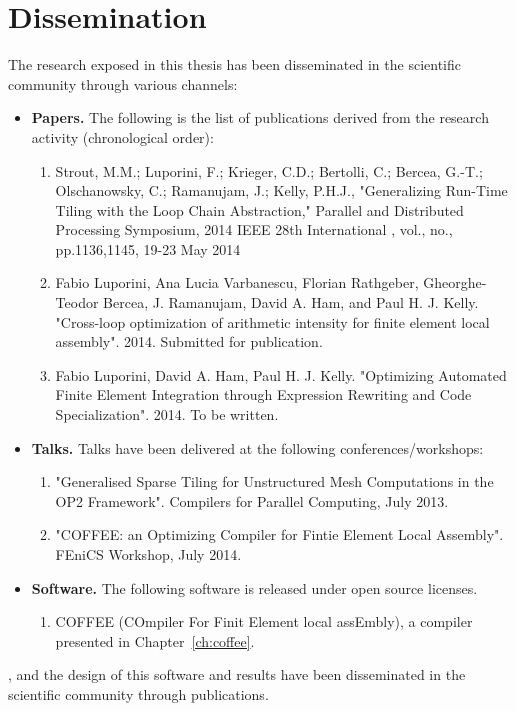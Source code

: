 \section{Dissemination}
The research exposed in this thesis has been disseminated in the scientific community through various channels:
\begin{itemize}
\item \textbf{Papers.} The following is the list of publications derived from the research activity (chronological order):
\begin{enumerate}
\item Strout, M.M.; Luporini, F.; Krieger, C.D.; Bertolli, C.; Bercea, G.-T.; Olschanowsky, C.; Ramanujam, J.; Kelly, P.H.J., "Generalizing Run-Time Tiling with the Loop Chain Abstraction," Parallel and Distributed Processing Symposium, 2014 IEEE 28th International , vol., no., pp.1136,1145, 19-23 May 2014
\item Fabio Luporini, Ana Lucia Varbanescu, Florian Rathgeber, Gheorghe-Teodor Bercea, J. Ramanujam, David A. Ham, and Paul H. J. Kelly. "Cross-loop optimization of arithmetic intensity for finite element local assembly". 2014. Submitted for publication.
\item Fabio Luporini, David A. Ham, Paul H. J. Kelly. "Optimizing Automated Finite Element Integration through Expression Rewriting and Code Specialization". 2014. To be written.
\end{enumerate}
\item \textbf{Talks.} Talks have been delivered at the following conferences/workshops:
\begin{enumerate}
\item "Generalised Sparse Tiling for Unstructured Mesh Computations in the OP2 Framework". Compilers for Parallel Computing, July 2013.
\item "COFFEE: an Optimizing Compiler for Fintie Element Local Assembly". FEniCS Workshop, July 2014.
\end{enumerate}
\item \textbf{Software.} The following software is released under open source licenses.
\begin{enumerate}
\item COFFEE (COmpiler For Finit Element local assEmbly), a compiler presented in Chapter~\ref{ch:coffee}.
\end{enumerate}
\end{itemize}
, and the design of this software and results have
been disseminated in the scientific community through publications.



